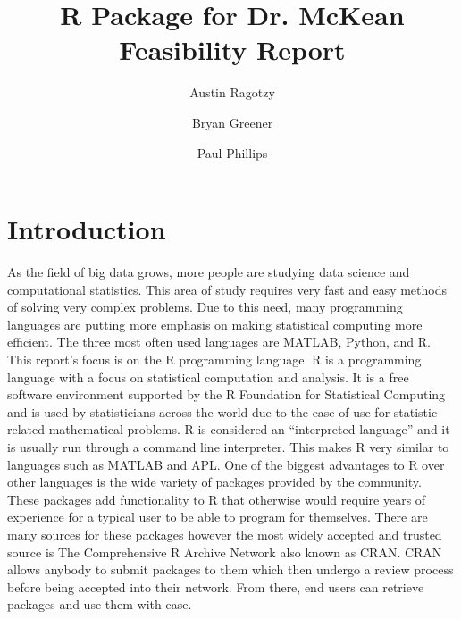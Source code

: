 \documentclass[12pt]{article}
\title{\huge R Package for Dr. McKean\\
	\LARGE Feasibility Report}
\author{Austin Ragotzy \and Bryan Greener \and Paul Phillips}
\begin{document}
\maketitle

\TabPositions{4cm}

\section{Introduction}
As the field of big data grows, more people are studying data science and computational statistics. This area of study requires very fast and easy methods of solving very complex problems. Due to this need, many programming languages are putting more emphasis on making statistical computing more efficient. The three most often used languages are MATLAB, Python, and R. This report's focus is on the R programming language. R is a programming language with a focus on statistical computation and analysis. It is a free software environment supported by the R Foundation for Statistical Computing and is used by statisticians across the world due to the ease of use for statistic related mathematical problems. R is considered an ``interpreted language'' and it is usually run through a command line interpreter. This makes R very similar to languages such as MATLAB and APL. One of the biggest advantages to R over other languages is the wide variety of packages provided by the community. These packages add functionality to R that otherwise would require years of experience for a typical user to be able to program for themselves. There are many sources for these packages however the most widely accepted and trusted source is The Comprehensive R Archive Network also known as CRAN\cite{cran}. CRAN allows anybody to submit packages to them which then undergo a review process before being accepted into their network. From there, end users can retrieve packages and use them with ease.
\end{document}
